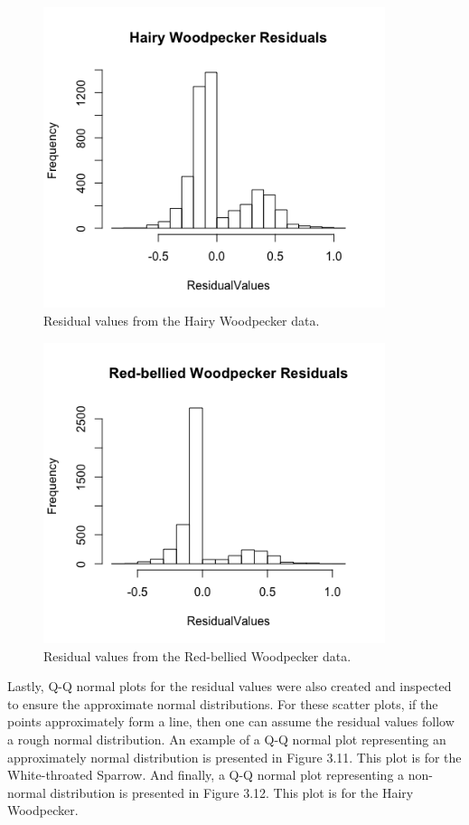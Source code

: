 \begin{figure}[h]
\centering
\includegraphics[width=10cm]{figures/HairyWoodResid.png}
\caption{Residual values from the Hairy Woodpecker data.}
\end{figure}

\begin{figure}[h]
\centering
\includegraphics[width=10cm]{figures/redbwoodResid.png}
\caption{Residual values from the Red-bellied Woodpecker data.}
\end{figure}

Lastly, Q-Q normal plots for the residual values were also created and inspected to ensure the approximate normal distributions. For these scatter plots, if the points approximately form a line, then one can assume the residual values follow a rough normal distribution. An example of a Q-Q normal plot representing an approximately normal distribution is presented in Figure 3.11. This plot is for the White-throated Sparrow. And finally, a Q-Q normal plot representing a non-normal distribution is presented in Figure 3.12. This plot is for the Hairy Woodpecker.

